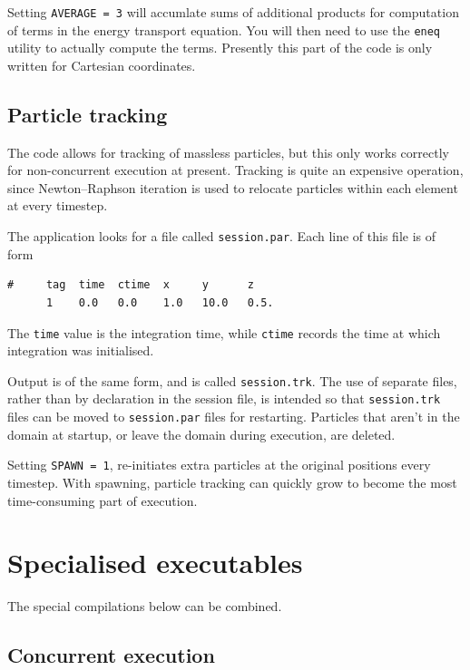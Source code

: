 \documentclass[11pt,a4paper]{report}
\begin{document}
Setting \verb+AVERAGE = 3+ will accumlate sums of additional products
for computation of terms in the energy transport equation. You will
then need to use the \verb+eneq+ utility to actually compute the
terms. Presently this part of the code is only written for Cartesian
coordinates.


\section{Particle tracking}
\label{sec.particle}

The code allows for tracking of massless particles, but this only
works correctly for non-concurrent execution at present.  Tracking is
quite an expensive operation, since Newton--Raphson iteration is used
to relocate particles within each element at every timestep.

The application looks for a file called \verb+session.par+.  Each line
of this file is of form
\begin{verbatim}
#     tag  time  ctime  x     y      z
      1    0.0   0.0    1.0   10.0   0.5.
\end{verbatim}
The \verb+time+ value is the integration time, while \verb+ctime+
records the time at which integration was initialised.

Output is of the same form, and is called \verb+session.trk+.  The use
of separate files, rather than by declaration in the session file, is
intended so that \verb+session.trk+ files can be moved to
\verb+session.par+ files for restarting.  Particles that aren't in the
domain at startup, or leave the domain during execution, are deleted.

Setting \verb+SPAWN = 1+, re-initiates extra particles at the original
positions every timestep.  With spawning, particle tracking can
quickly grow to become the most time-consuming part of execution.

\chapter{Specialised executables}

The special compilations below can be combined.

\section{Concurrent execution}
\label{sec.parallel}
\end{document}
